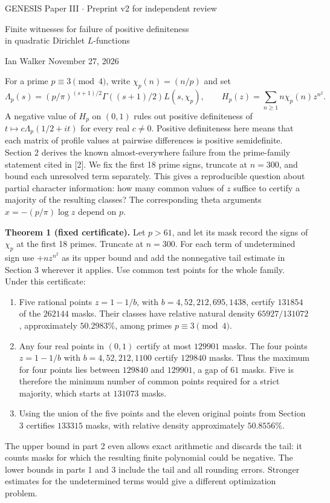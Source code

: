 \documentclass[11pt]{article}
\newcommand{\sechead}[1]{\medskip{\large\bfseries #1}\par}
\begin{document}
{\small GENESIS \hfill Paper III $\cdot$ Preprint v2 for independent review}

{\LARGE\bfseries\raggedright Finite witnesses for failure of positive definiteness\\ in quadratic Dirichlet $L$-functions\par}
Ian Walker \hfill November 27, 2026

\sechead{1. An explicit test and its minimum size}
For a prime $p\equiv3\pmod4$, write $\chi_p(n)=(n/p)$ and set
\[
 \Lambda_p(s)=(p/\pi)^{(s+1)/2}\Gamma((s+1)/2)L(s,\chi_p),
 \qquad H_p(z)=\sum_{n\ge1}n\chi_p(n)z^{n^2}.
\]
A negative value of $H_p$ on $(0,1)$ rules out positive definiteness of $t\mapsto c\Lambda_p(1/2+it)$ for every real $c\ne0$. Positive definiteness here means that each matrix of profile values at pairwise differences is positive semidefinite. Section 2 derives the known almost-everywhere failure from the prime-family statement cited in [2]. We fix the first 18 prime signs, truncate at $n=300$, and bound each unresolved term separately. This gives a reproducible question about partial character information: how many common values of $z$ suffice to certify a majority of the resulting classes? The corresponding theta arguments $x=-(p/\pi)\log z$ depend on $p$.

\textbf{Theorem 1 (fixed certificate).} Let $p>61$, and let its mask record the signs of $\chi_p$ at the first 18 primes. Truncate at $n=300$. For each term of undetermined sign use $+nz^{n^2}$ as its upper bound and add the nonnegative tail estimate in Section 3 wherever it applies. Use common test points for the whole family. Under this certificate:
\begin{enumerate}
\item Five rational points $z=1-1/b$, with $b=4,52,212,695,1438$, certify $131854$ of the $262144$ masks. Their classes have relative natural density $65927/131072$, approximately $50.2983\%$, among primes $p\equiv3\pmod4$.
\item Any four real points in $(0,1)$ certify at most $129901$ masks. The four points $z=1-1/b$ with $b=4,52,212,1100$ certify $129840$ masks. Thus the maximum for four points lies between $129840$ and $129901$, a gap of $61$ masks. Five is therefore the minimum number of common points required for a strict majority, which starts at $131073$ masks.
\item Using the union of the five points and the eleven original points from Section 3 certifies $133315$ masks, with relative density approximately $50.8556\%$.
\end{enumerate}
The upper bound in part 2 even allows exact arithmetic and discards the tail: it counts masks for which the resulting finite polynomial could be negative. The lower bounds in parts 1 and 3 include the tail and all rounding errors. Stronger estimates for the undetermined terms would give a different optimization problem.
\end{document}
